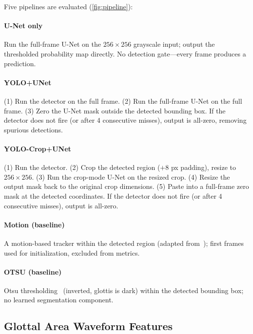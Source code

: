 \documentclass[preprint,12pt]{elsarticle}
\newcommand{\yolounet}{YOLO+UNet}
\newcommand{\yolocrop}{YOLO-Crop+UNet}
\begin{document}
Five pipelines are evaluated (\cref{fig:pipeline}):

\paragraph{U-Net only}
Run the full-frame U-Net on the \(256\times256\) grayscale input; output the
thresholded probability map directly.
No detection gate---every frame produces a prediction.

\paragraph{\yolounet{}}
(1) Run the detector on the full frame.
(2) Run the full-frame U-Net on the full frame.
(3) Zero the U-Net mask outside the detected bounding box.
If the detector does not fire (or after \num{4} consecutive misses), output is
all-zero, removing spurious detections.

\paragraph{\yolocrop{}}
(1) Run the detector.
(2) Crop the detected region (\(+8\) px padding), resize to \(256\times256\).
(3) Run the crop-mode U-Net on the resized crop.
(4) Resize the output mask back to the original crop dimensions.
(5) Paste into a full-frame zero mask at the detected coordinates.
If the detector does not fire (or after \num{4} consecutive misses), output is
all-zero.

\paragraph{Motion (baseline)}
A motion-based tracker within the detected region (adapted from~\cite{patel2015kinematic}); first frames used for initialization, excluded from metrics.

\paragraph{OTSU (baseline)}
Otsu thresholding~\cite{otsu1979threshold} (inverted, glottis is dark) within the detected bounding box; no learned segmentation component.

\subsection{Glottal Area Waveform Features}
\label{sec:gaw_features}
\end{document}
